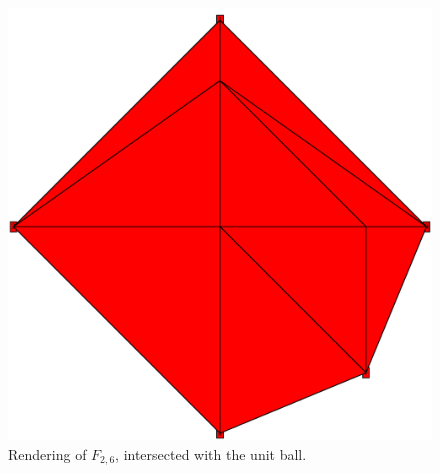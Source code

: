 \documentclass[12pt,letter]{article}
\begin{document}
\begin{figure}[h!]\begin{centering}
		\includegraphics[scale=.3]{f5v}\caption{\label{visual}Rendering of $F_{2,6}$, intersected with the unit ball.}\end{centering}
\end{figure}
\newpage
\nocite{*}
\printbibliography
\end{document}

